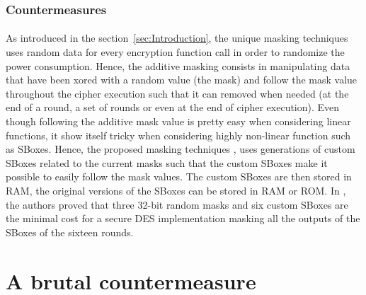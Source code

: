 \documentclass[11pt,a4paper]{article}
\begin{document}
{{{{{{\subsubsection{Countermeasures}
\label{subsec:old_countermeasure}
\paragraph{}
As introduced in the section~\ref{sec:Introduction}, the unique masking techniques uses random data for every encryption function call in order to randomize the power consumption. Hence, the
additive masking consists in manipulating data that have been xored with a random value (the mask) and follow the mask value throughout the cipher execution such that it can removed 
when needed (at the end of a round, a set of rounds or even at the end of cipher execution). Even though following the additive mask value is pretty easy when considering linear functions,
it show itself tricky when considering highly non-linear function such as SBoxes. Hence, the proposed masking techniques \cite{AkkarGiraud01, AkkarGoubin03, AkkarBevanGoubin04}, uses generations
of custom SBoxes related to the current masks such that the custom SBoxes make it possible to easily follow the mask values. The custom SBoxes are then stored in RAM, the original versions 
of the SBoxes can be stored in RAM or ROM. In \cite{JiqiangLvYongfei05}, the authors proved that three 32-bit random masks and six custom SBoxes are the minimal
cost for a secure DES implementation masking all the outputs of the SBoxes of the sixteen rounds. 

\section{A brutal countermeasure}      
\label{sec:brutalcontermeasure}
}}}}}}
\end{document}
